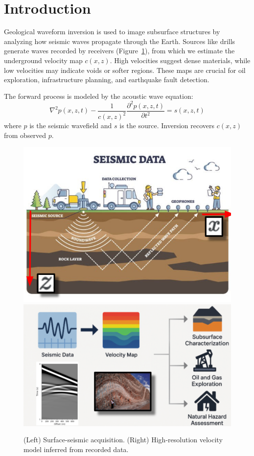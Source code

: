 \documentclass{article}
\newcommand{\instructions}[1]{{\color{blue} #1}}
\begin{document}


\section{Introduction}

Geological waveform inversion is used to image subsurface structures by analyzing how seismic waves propagate through the Earth. Sources like drills generate waves recorded by receivers (Figure~\ref{fig:intro}), from which we estimate the underground velocity map $c(x, z)$. High velocities suggest dense materials, while low velocities may indicate voids or softer regions. These maps are crucial for oil exploration, infrastructure planning, and earthquake fault detection.

\vspace{4pt}
The forward process is modeled by the acoustic wave equation:
\[
\nabla^2 p(x, z, t) - \frac{1}{c(x, z)^2} \frac{\partial^2 p(x, z, t)}{\partial t^2} = s(x, z, t)
\]
where $p$ is the seismic wavefield and $s$ is the source. Inversion recovers $c(x, z)$ from observed $p$.

\begin{figure}
    \centering
    \includegraphics[width=0.49\linewidth]{figures/intro1.png}
    \hfill
    \includegraphics[width=0.49\linewidth]{figures/intro2.png}
    \caption{(Left) Surface-seismic acquisition. (Right) High-resolution velocity model inferred from recorded data.}
    \label{fig:intro}
\end{figure}
\end{document}
